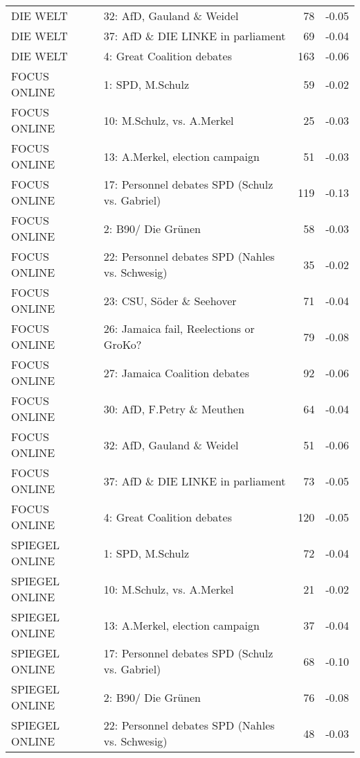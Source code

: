 \begin{table}[ht]
\begin{tabular}{llrr}
  DIE WELT & 32: AfD, Gauland \& Weidel &  78 & -0.05 \\ 
  DIE WELT & 37: AfD \& DIE LINKE in parliament &  69 & -0.04 \\ 
  DIE WELT & 4: Great Coalition debates & 163 & -0.06 \\ 
  FOCUS ONLINE & 1: SPD, M.Schulz &  59 & -0.02 \\ 
  FOCUS ONLINE & 10: M.Schulz, vs. A.Merkel &  25 & -0.03 \\ 
  FOCUS ONLINE & 13: A.Merkel, election campaign &  51 & -0.03 \\ 
  FOCUS ONLINE & 17: Personnel debates SPD (Schulz vs. Gabriel) & 119 & -0.13 \\ 
  FOCUS ONLINE & 2: B90/ Die Grünen &  58 & -0.03 \\ 
  FOCUS ONLINE & 22: Personnel debates SPD (Nahles vs. Schwesig) &  35 & -0.02 \\ 
  FOCUS ONLINE & 23: CSU, Söder \& Seehover &  71 & -0.04 \\ 
  FOCUS ONLINE & 26: Jamaica fail, Reelections or GroKo? &  79 & -0.08 \\ 
  FOCUS ONLINE & 27: Jamaica Coalition debates &  92 & -0.06 \\ 
  FOCUS ONLINE & 30: AfD, F.Petry \& Meuthen &  64 & -0.04 \\ 
  FOCUS ONLINE & 32: AfD, Gauland \& Weidel &  51 & -0.06 \\ 
  FOCUS ONLINE & 37: AfD \& DIE LINKE in parliament &  73 & -0.05 \\ 
  FOCUS ONLINE & 4: Great Coalition debates & 120 & -0.05 \\ 
  SPIEGEL ONLINE & 1: SPD, M.Schulz &  72 & -0.04 \\ 
  SPIEGEL ONLINE & 10: M.Schulz, vs. A.Merkel &  21 & -0.02 \\ 
  SPIEGEL ONLINE & 13: A.Merkel, election campaign &  37 & -0.04 \\ 
  SPIEGEL ONLINE & 17: Personnel debates SPD (Schulz vs. Gabriel) &  68 & -0.10 \\ 
  SPIEGEL ONLINE & 2: B90/ Die Grünen &  76 & -0.08 \\ 
  SPIEGEL ONLINE & 22: Personnel debates SPD (Nahles vs. Schwesig) &  48 & -0.03 \\ 
   \hline
\end{tabular}
\end{table}
